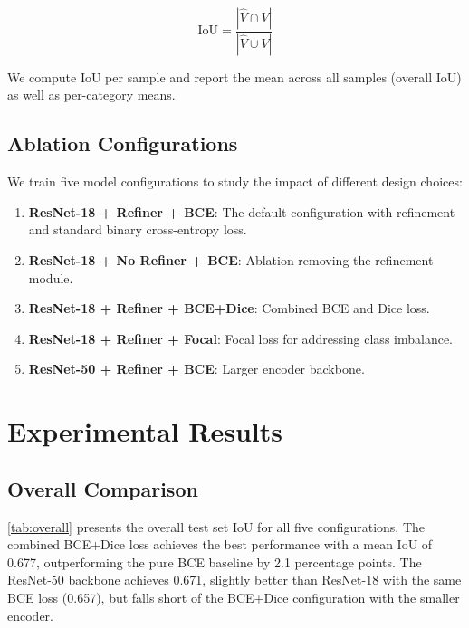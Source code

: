 \documentclass[10pt,twocolumn,letterpaper]{article}
\begin{document}
\begin{equation}
\text{IoU} = \frac{|\hat{V} \cap V|}{|\hat{V} \cup V|}
\end{equation}

We compute IoU per sample and report the mean across all samples (overall IoU) as well as per-category means.

\subsection{Ablation Configurations}

We train five model configurations to study the impact of different design choices:

\begin{enumerate}
    \item \textbf{ResNet-18 + Refiner + BCE}: The default configuration with refinement and standard binary cross-entropy loss.
    \item \textbf{ResNet-18 + No Refiner + BCE}: Ablation removing the refinement module.
    \item \textbf{ResNet-18 + Refiner + BCE+Dice}: Combined BCE and Dice loss.
    \item \textbf{ResNet-18 + Refiner + Focal}: Focal loss for addressing class imbalance.
    \item \textbf{ResNet-50 + Refiner + BCE}: Larger encoder backbone.
\end{enumerate}

\section{Experimental Results}
\label{sec:results}

\subsection{Overall Comparison}

\cref{tab:overall} presents the overall test set IoU for all five configurations. The combined BCE+Dice loss achieves the best performance with a mean IoU of 0.677, outperforming the pure BCE baseline by 2.1 percentage points. The ResNet-50 backbone achieves 0.671, slightly better than ResNet-18 with the same BCE loss (0.657), but falls short of the BCE+Dice configuration with the smaller encoder.
\end{document}
